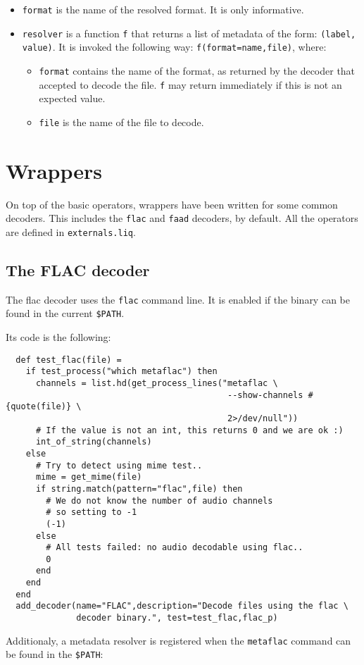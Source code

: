 \begin{itemize}
\item \verb+format+ is the name of the resolved format. It is only informative.
\item \verb+resolver+ is a function \verb+f+ that returns a list of metadata of the form: \verb+(label, value)+. It is invoked the following way: \verb+f(format=name,file)+, where:\begin{itemize}
\item \verb+format+ contains the name of the format, as returned by the decoder that accepted to decode the file. \verb+f+ may return immediately if this is not an expected value.
\item \verb+file+ is the name of the file to decode.

\end{itemize}


\end{itemize}
\section{Wrappers}
On top of the basic operators, wrappers have been written for some common decoders. This includes the \verb+flac+ and 
\verb+faad+ decoders, by default. All the operators are defined in \verb+externals.liq+.

\subsection{The FLAC decoder}
The flac decoder uses the \verb+flac+ command line. It is enabled if the binary can be found in the current \verb+$PATH+.

Its code is the following:

\begin{verbatim}
  def test_flac(file) =
    if test_process("which metaflac") then
      channels = list.hd(get_process_lines("metaflac \
                                            --show-channels #{quote(file)} \
                                            2>/dev/null"))
      # If the value is not an int, this returns 0 and we are ok :)
      int_of_string(channels)
    else
      # Try to detect using mime test..
      mime = get_mime(file)
      if string.match(pattern="flac",file) then
        # We do not know the number of audio channels
        # so setting to -1
        (-1)
      else
        # All tests failed: no audio decodable using flac..
        0
      end
    end
  end
  add_decoder(name="FLAC",description="Decode files using the flac \
              decoder binary.", test=test_flac,flac_p)
\end{verbatim}
Additionaly, a metadata resolver is registered when the \verb+metaflac+ command can be found in the \verb+$PATH+:


